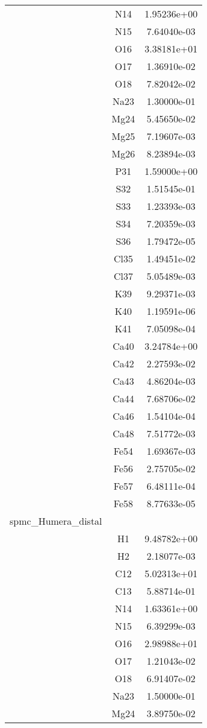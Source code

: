 \begin{centering}
\begin{longtable}{l c c}
& N14 & 1.95236e+00 \\ 
& N15 & 7.64040e-03 \\ 
& O16 & 3.38181e+01 \\ 
& O17 & 1.36910e-02 \\ 
& O18 & 7.82042e-02 \\ 
& Na23 & 1.30000e-01 \\ 
& Mg24 & 5.45650e-02 \\ 
& Mg25 & 7.19607e-03 \\ 
& Mg26 & 8.23894e-03 \\ 
& P31 & 1.59000e+00 \\ 
& S32 & 1.51545e-01 \\ 
& S33 & 1.23393e-03 \\ 
& S34 & 7.20359e-03 \\ 
& S36 & 1.79472e-05 \\ 
& Cl35 & 1.49451e-02 \\ 
& Cl37 & 5.05489e-03 \\ 
& K39 & 9.29371e-03 \\ 
& K40 & 1.19591e-06 \\ 
& K41 & 7.05098e-04 \\ 
& Ca40 & 3.24784e+00 \\ 
& Ca42 & 2.27593e-02 \\ 
& Ca43 & 4.86204e-03 \\ 
& Ca44 & 7.68706e-02 \\ 
& Ca46 & 1.54104e-04 \\ 
& Ca48 & 7.51772e-03 \\ 
& Fe54 & 1.69367e-03 \\ 
& Fe56 & 2.75705e-02 \\ 
& Fe57 & 6.48111e-04 \\ 
& Fe58 & 8.77633e-05 \\ 
\hline
spmc_Humera_distal & & \\
\hline
& H1 & 9.48782e+00 \\ 
& H2 & 2.18077e-03 \\ 
& C12 & 5.02313e+01 \\ 
& C13 & 5.88714e-01 \\ 
& N14 & 1.63361e+00 \\ 
& N15 & 6.39299e-03 \\ 
& O16 & 2.98988e+01 \\ 
& O17 & 1.21043e-02 \\ 
& O18 & 6.91407e-02 \\ 
& Na23 & 1.50000e-01 \\ 
& Mg24 & 3.89750e-02 \\ 

\end{longtable}
\end{centering}
